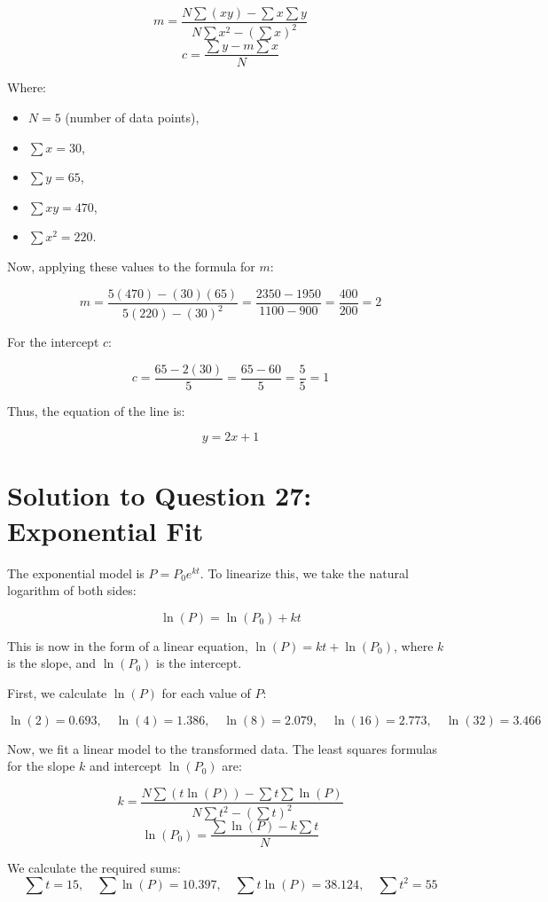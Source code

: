 \documentclass[11pt]{article}
\begin{document}
\[
m = \frac{N \sum (xy) - \sum x \sum y}{N \sum x^2 - (\sum x)^2}
\]
\[
c = \frac{\sum y - m \sum x}{N}
\]

Where:
\begin{itemize}
    \item \( N = 5 \) (number of data points),
    \item \( \sum x = 30 \),
    \item \( \sum y = 65 \),
    \item \( \sum xy = 470 \),
    \item \( \sum x^2 = 220 \).
\end{itemize}

Now, applying these values to the formula for \( m \):

\[
m = \frac{5(470) - (30)(65)}{5(220) - (30)^2} = \frac{2350 - 1950}{1100 - 900} = \frac{400}{200} = 2
\]

For the intercept \( c \):

\[
c = \frac{65 - 2(30)}{5} = \frac{65 - 60}{5} = \frac{5}{5} = 1
\]

Thus, the equation of the line is:

\[
y = 2x + 1
\]

\section*{Solution to Question 27: Exponential Fit}

The exponential model is \( P = P_0 e^{kt} \). To linearize this, we take the natural logarithm of both sides:

\[
\ln(P) = \ln(P_0) + kt
\]

This is now in the form of a linear equation, \( \ln(P) = kt + \ln(P_0) \), where \( k \) is the slope, and \( \ln(P_0) \) is the intercept.

First, we calculate \( \ln(P) \) for each value of \( P \):

\[
\ln(2) = 0.693, \quad \ln(4) = 1.386, \quad \ln(8) = 2.079, \quad \ln(16) = 2.773, \quad \ln(32) = 3.466
\]

Now, we fit a linear model to the transformed data. The least squares formulas for the slope \( k \) and intercept \( \ln(P_0) \) are:

\[
k = \frac{N \sum (t \ln(P)) - \sum t \sum \ln(P)}{N \sum t^2 - (\sum t)^2}
\]
\[
\ln(P_0) = \frac{\sum \ln(P) - k \sum t}{N}
\]

We calculate the required sums:
\[
\sum t = 15, \quad \sum \ln(P) = 10.397, \quad \sum t \ln(P) = 38.124, \quad \sum t^2 = 55
\]
\end{document}
